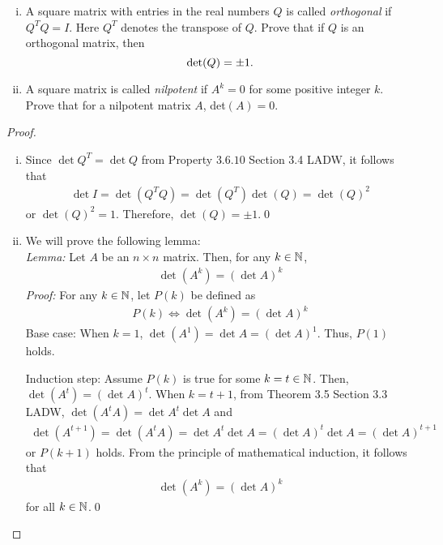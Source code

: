 \begin{question}
	\normalfont 
	\begin{enumerate}[(i)]
	
	\item A square matrix with entries in the real numbers $Q$ is called \emph{orthogonal} if $Q^TQ = I$. Here $Q^T$ denotes the transpose of $Q$. Prove that if $Q$ is an orthogonal matrix, then 
	\[
	\textup{det}(Q) = \pm 1. 
	\]
	
	\item A square matrix is called \emph{nilpotent} if $A^k =0$ for some positive integer $k$. Prove that for a nilpotent matrix $A$, det$(A)=0$. 
	\end{enumerate}
	\end{question}

\begin{proof}
    \renewcommand{\qedsymbol}{$\blacksquare$}
    \begin{enumerate}[(i)]
        \item Since $\det Q^T=\det Q$ from Property $3.6.10$ Section 3.4 LADW, it follows that 
        \[
            \begin{aligned}
                \det I=\det(Q^TQ)=\det(Q^T)\det(Q)=\det(Q)^2
            \end{aligned}
        \]
        or $\det(Q)^2=1$. Therefore, $\det(Q)=\pm 1$.\qed
        \item We will prove the following lemma:\\
        \textit{Lemma: }Let $A$ be an $n\times n$ matrix. Then, for any $k\in\mathbb N$, 
        \[
            \begin{aligned}
                \det(A^k)=(\det A)^k
            \end{aligned}
        \]
        \textit{Proof: } For any $k\in\mathbb N$, let $P(k)$ be defined as 
        \[
            \begin{aligned}
                P(k)\iff \det(A^k)=(\det A)^k
            \end{aligned}
        \]
        Base case: When $k=1$, $\det(A^1)=\det A=(\det A)^1$. Thus, $P(1)$ holds.

        Induction step: Assume $P(k)$ is true for some $k=t\in\mathbb N$.
        Then, $\det(A^t)=(\det A)^t$.
        When $k=t+1$, from Theorem 3.5 Section 3.3 LADW, $\det(A^tA)=\det A^t\det A$ and
        \[
            \begin{aligned}
                \det(A^{t+1})=\det(A^tA)=\det A^t\det A=(\det A)^t\det A=(\det A)^{t+1}
            \end{aligned}
        \]
        or $P(k+1)$ holds.
        From the principle of mathematical induction, it follows that 
        \[
            \begin{aligned}
                \det(A^k)=(\det A)^k
            \end{aligned}
        \]
        for all $k\in\mathbb N$.\qed


\end{enumerate}
\end{proof}
